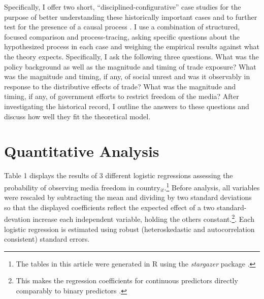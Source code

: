 \documentclass[12pt,a4paper]{article}\usepackage[]{graphicx}\usepackage[]{color}
\begin{document}
Specifically, I offer two short, “disciplined-configurative” case studies for the purpose of better understanding these historically important cases and to further test for the presence of a causal process \parencite[75]{george2005case}. I use a combination of structured, focused comparison and process-tracing, asking specific questions about the hypothesized process in each case and weighing the empirical results against what the theory expects. Specifically, I ask the following three questions. What was the policy background as well as the magnitude and timing of trade exposure? What was the magnitude and timing, if any, of social unrest and was it observably in response to the distributive effects of trade? What was the magnitude and timing, if any, of government efforts to restrict freedom of the media? After investigating the historical record, I outline the answers to these questions and discuss how well they fit the theoretical model.

\section{Quantitative Analysis}

Table 1 displays the results of 3 different logistic regressions assessing the probability of observing media freedom in country$_{it}$.\footnote{The tables in this article were generated in R using the \emph{stargazer} package \parencite{stargazerLaTeXcod:vw}.} Before analysis, all variables were rescaled by subtracting the mean and dividing by two standard deviations so that the displayed coefficients reflect the expected effect of a two standard-devation increase each independent variable, holding the others constant.\footnote{This makes the regression coefficients for continuous predictors directly comparably to binary predictors \parencite{Gelman:2008gz}.}. Each logistic regression is estimated using robust (heteroskedastic and autocorrelation consistent) standard errors.
\end{document}
